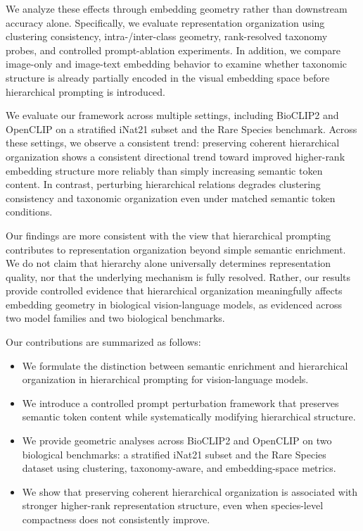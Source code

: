 We analyze these effects through embedding geometry rather than downstream accuracy alone. Specifically, we evaluate representation organization using clustering consistency, intra-/inter-class geometry, rank-resolved taxonomy probes, and controlled prompt-ablation experiments. In addition, we compare image-only and image-text embedding behavior to examine whether taxonomic structure is already partially encoded in the visual embedding space before hierarchical prompting is introduced.

We evaluate our framework across multiple settings, including BioCLIP2 and OpenCLIP on a stratified iNat21 subset and the Rare Species benchmark. Across these settings, we observe a consistent trend: preserving coherent hierarchical organization shows a consistent directional trend toward improved higher-rank embedding structure more reliably than simply increasing semantic token content. In contrast, perturbing hierarchical relations degrades clustering consistency and taxonomic organization even under matched semantic token conditions.

Our findings are more consistent with the view that hierarchical prompting contributes to representation organization beyond simple semantic enrichment. We do not claim that hierarchy alone universally determines representation quality, nor that the underlying mechanism is fully resolved. Rather, our results provide controlled evidence that hierarchical organization meaningfully affects embedding geometry in biological vision-language models, as evidenced across two model families and two biological benchmarks.

Our contributions are summarized as follows:

\begin{itemize}

\item We formulate the distinction between semantic enrichment and hierarchical organization in hierarchical prompting for vision-language models.

\item We introduce a controlled prompt perturbation framework that preserves semantic token content while systematically modifying hierarchical structure.

\item We provide geometric analyses across BioCLIP2 and OpenCLIP on two biological benchmarks:
a stratified iNat21 subset and the Rare Species dataset using clustering, taxonomy-aware, and embedding-space metrics.

\item We show that preserving coherent hierarchical organization is associated with stronger higher-rank representation structure, even when species-level compactness does not consistently improve.

\end{itemize}
